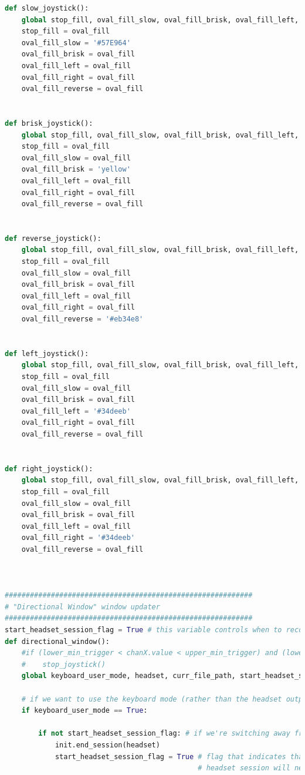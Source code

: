 \documentclass[conference]{IEEEtran}
\begin{document}
\begin{lstlisting}[language=Python, caption=GUI CODE, label=gui_code]
def slow_joystick():
    global stop_fill, oval_fill_slow, oval_fill_brisk, oval_fill_left, oval_fill_right, oval_fill_reverse, oval_fill
    stop_fill = oval_fill
    oval_fill_slow = '#57E964'
    oval_fill_brisk = oval_fill
    oval_fill_left = oval_fill
    oval_fill_right = oval_fill
    oval_fill_reverse = oval_fill


def brisk_joystick():
    global stop_fill, oval_fill_slow, oval_fill_brisk, oval_fill_left, oval_fill_right, oval_fill_reverse, oval_fill
    stop_fill = oval_fill
    oval_fill_slow = oval_fill
    oval_fill_brisk = 'yellow'
    oval_fill_left = oval_fill
    oval_fill_right = oval_fill
    oval_fill_reverse = oval_fill


def reverse_joystick():
    global stop_fill, oval_fill_slow, oval_fill_brisk, oval_fill_left, oval_fill_right, oval_fill_reverse, oval_fill
    stop_fill = oval_fill
    oval_fill_slow = oval_fill
    oval_fill_brisk = oval_fill
    oval_fill_left = oval_fill
    oval_fill_right = oval_fill
    oval_fill_reverse = '#eb34e8'


def left_joystick():
    global stop_fill, oval_fill_slow, oval_fill_brisk, oval_fill_left, oval_fill_right, oval_fill_reverse, oval_fill
    stop_fill = oval_fill
    oval_fill_slow = oval_fill
    oval_fill_brisk = oval_fill
    oval_fill_left = '#34deeb'
    oval_fill_right = oval_fill
    oval_fill_reverse = oval_fill


def right_joystick():
    global stop_fill, oval_fill_slow, oval_fill_brisk, oval_fill_left, oval_fill_right, oval_fill_reverse, oval_fill
    stop_fill = oval_fill
    oval_fill_slow = oval_fill
    oval_fill_brisk = oval_fill
    oval_fill_left = oval_fill
    oval_fill_right = '#34deeb'
    oval_fill_reverse = oval_fill



###########################################################
# "Directional Window" window updater
###########################################################
start_headset_session_flag = True # this variable controls when to record data from headset
def directional_window():
    #if (lower_min_trigger < chanX.value < upper_min_trigger) and (lower_min_trigger < chanY.value < upper_min_trigger):
    #    stop_joystick()
    global keyboard_user_mode, headset, curr_file_path, start_headset_session_flag

    # if we want to use the keyboard mode (rather than the headset outputs)
    if keyboard_user_mode == True:
        
        if not start_headset_session_flag: # if we're switching away from using the headset
            init.end_session(headset)
            start_headset_session_flag = True # flag that indicates that the 
                                              # headset session will need to restart 


\end{lstlisting}
\end{document}
